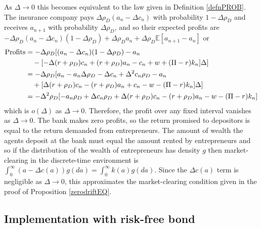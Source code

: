 \documentclass[11pt]{article}
\theoremstyle{plain}
\theoremstyle{definition} %
\begin{document}
As $\Delta \rightarrow 0$ this becomes equivalent to the law given in Definition \ref{defnPROB}. The insurance company pays $\Delta \rho_D(a_n - \Delta c_n)$ with probability $1-\Delta \rho_D$ and receives $a_{n+1}$ with probability $\Delta \rho_D$, and so their expected profits are $-\Delta \rho_D(a_n - \Delta c_n)(1-\Delta \rho_D) + \Delta \rho_Da_n + \Delta \rho_D\mathbb{E}[a_{n+1} - a_n] $ or
\begin{align*}
\textnormal{Profits} & =  -\Delta \rho_D [(a_n - \Delta c_n)(1-\Delta \rho_D) - a_n
\\ & \ \ \  -[-\Delta(r+\rho_D) c_n + (r+\rho_D)a_n -  c_n + w + (\Pi - r)k_n]\Delta]
\\ & =  -\Delta \rho_D [a_n - a_n\Delta \rho_D - \Delta c_n + \Delta^2 c_n\rho_D - a_n
\\ & \ \ \  +[\Delta(r+\rho_D) c_n - (r+\rho_D)a_n +  c_n - w - (\Pi - r)k_n]\Delta]
\\ & = -\Delta^2 \rho_D [ - a_n \rho_D + \Delta c_n \rho_D + \Delta (r + \rho_D) c_n - (r + \rho_D) a_n - w - (\Pi - r)k_n]
\end{align*} 
which is $o(\Delta)$ as $\Delta \rightarrow 0$. Therefore, the profit over any fixed interval vanishes as $\Delta \rightarrow 0$. The bank makes zero profits, so the return promised to depositors is equal to the return demanded from entrepreneurs. The amount of wealth the agents deposit at the bank must equal the amount rented by entrepreneurs and so if the distribution of the wealth of entrepreneurs has density $g$ then market-clearing in the discrete-time environment is $\int_0^{\infty}(a - \Delta c(a))g(da) = \int_{0}^{\infty}k(a)g(da)$. Since the $\Delta c(a)$ term is negligible as $\Delta \rightarrow 0$, this approximates the market-clearing condition given in the proof of Proposition \ref{zerodriftEQ}. 

\subsection{Implementation with risk-free bond} \label{decentDT}
\end{document}
